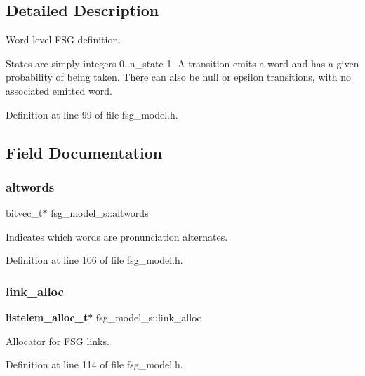 \subsection{Detailed Description}
Word level F\+SG definition. 

States are simply integers 0..n\+\_\+state-\/1. A transition emits a word and has a given probability of being taken. There can also be null or epsilon transitions, with no associated emitted word. 

Definition at line 99 of file fsg\+\_\+model.\+h.



\subsection{Field Documentation}
\mbox{\label{structfsg__model__s_adb51d840853d7ef3315bd833cddeb748}} 
\subsubsection{altwords}
{\footnotesize\ttfamily bitvec\+\_\+t$\ast$ fsg\+\_\+model\+\_\+s\+::altwords}



Indicates which words are pronunciation alternates. 



Definition at line 106 of file fsg\+\_\+model.\+h.

\mbox{\label{structfsg__model__s_ac4e2a36305bbe62a5c7468588eb058b1}} 
\subsubsection{link\+\_\+alloc}
{\footnotesize\ttfamily \textbf{ listelem\+\_\+alloc\+\_\+t}$\ast$ fsg\+\_\+model\+\_\+s\+::link\+\_\+alloc}



Allocator for F\+SG links. 



Definition at line 114 of file fsg\+\_\+model.\+h.

\mbox{\label{structfsg__model__s_ab0b22dadb593ee1901829f89c4a47fe2}} 
